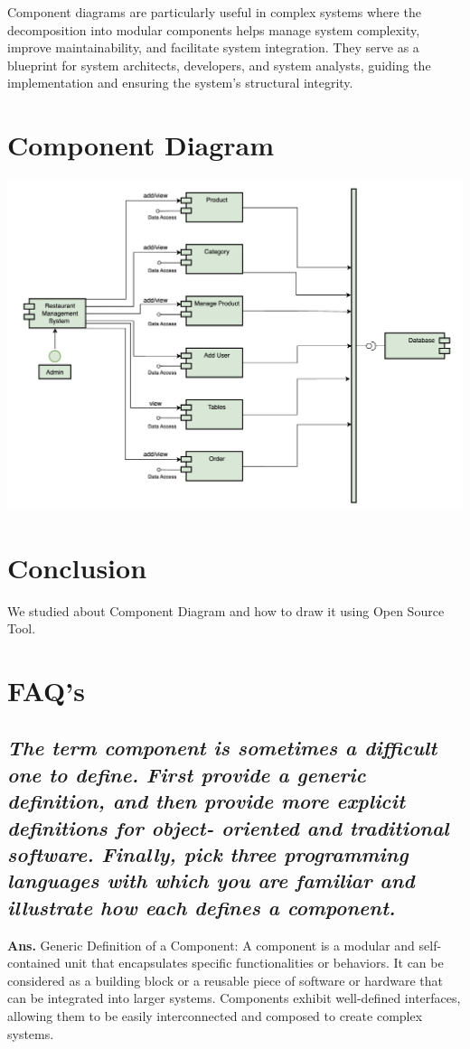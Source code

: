 \documentclass{article}
\begin{document}
Component diagrams are particularly useful in complex systems where the decomposition into modular components helps manage system complexity, improve maintainability, and facilitate system integration. They serve as a blueprint for system architects, developers, and system analysts, guiding the implementation and ensuring the system's structural integrity.
\section{\textbf{Component Diagram}}
\begin{center}
    \includegraphics[scale = 0.5]{Component Diagram.png}
\end{center}
\section{\textbf{Conclusion}}
We studied about Component Diagram and how to draw it using Open Source Tool.
\section{\textbf{FAQ's}}
\subsection{\textit{The term component is sometimes a difficult one to define. First provide a
generic definition, and then provide more explicit definitions for object-
oriented and traditional software. Finally, pick three programming
languages with which you are familiar and illustrate how each defines a
component.}}
\textbf{Ans.} Generic Definition of a Component: A component is a modular and self-contained unit that encapsulates specific functionalities or behaviors. It can be considered as a building block or a reusable piece of software or hardware that can be integrated into larger systems. Components exhibit well-defined interfaces, allowing them to be easily interconnected and composed to create complex systems.\\
\end{document}
